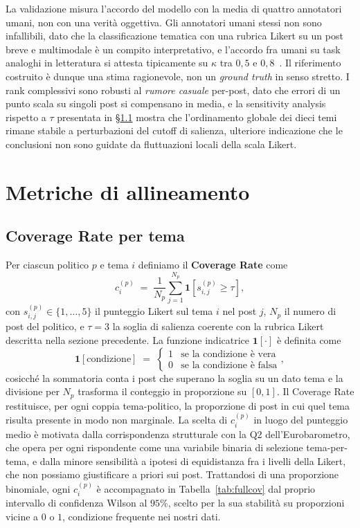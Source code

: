 \documentclass[11pt, a4paper]{article}
\begin{document}
La validazione misura l'accordo del modello con la media di quattro
annotatori umani, non con una verit\`a oggettiva. Gli annotatori umani
stessi non sono infallibili, dato che la classificazione tematica con
una rubrica Likert su un post breve e multimodale \`e un compito
interpretativo, e l'accordo fra umani su task analoghi in letteratura
si attesta tipicamente su $\kappa$ tra $0{,}5$ e
$0{,}8$~\cite{artstein2008}. Il riferimento costruito \`e dunque una
stima ragionevole, non un \textit{ground truth} in senso stretto. I
rank complessivi sono robusti al \emph{rumore casuale} per-post, dato
che errori di un punto scala su singoli post si compensano in media,
e la sensitivity analysis rispetto a $\tau$ presentata in
\S\ref{sec:coverage} mostra che l'ordinamento globale dei dieci temi
rimane stabile a perturbazioni del cutoff di salienza, ulteriore
indicazione che le conclusioni non sono guidate da fluttuazioni
locali della scala Likert.

\section{Metriche di allineamento}

\subsection{Coverage Rate per tema}\label{sec:coverage}

Per ciascun politico $p$ e tema $i$ definiamo il \textbf{Coverage
Rate} come
\[
  c_i^{(p)} \;=\; \frac{1}{N_p}\sum_{j=1}^{N_p}
  \mathbf{1}\!\left[s_{i,j}^{(p)} \geq \tau\right],
\]
con $s_{i,j}^{(p)}\in\{1,\dots,5\}$ il punteggio Likert sul tema $i$
nel post $j$, $N_p$ il numero di post del politico, e $\tau=3$ la
soglia di salienza coerente con la rubrica Likert descritta nella sezione precedente. La
funzione indicatrice $\mathbf{1}[\cdot]$ \`e definita come
\[
  \mathbf{1}[\text{condizione}] \;=\; \begin{cases}
    1 & \text{se la condizione \`e vera}\\
    0 & \text{se la condizione \`e falsa}
  \end{cases},
\]
cosicch\'e la sommatoria conta i post che superano la soglia su un
dato tema e la divisione per $N_p$ trasforma il conteggio in
proporzione su $[0,1]$. Il Coverage Rate restituisce, per ogni coppia
tema-politico, la proporzione di post in cui quel tema risulta
presente in modo non marginale. La scelta di $c_i^{(p)}$ in luogo del
punteggio medio \`e motivata dalla corrispondenza strutturale con la
Q2 dell'Eurobarometro, che opera per ogni rispondente come una
variabile binaria di selezione tema-per-tema, e dalla minore
sensibilit\`a a ipotesi di equidistanza fra i livelli della Likert,
che non possiamo giustificare a priori sui post. Trattandosi di una
proporzione binomiale, ogni $c_i^{(p)}$ \`e accompagnato in
Tabella~\ref{tab:fullcov} dal proprio intervallo di confidenza Wilson
al $95\%$, scelto per la sua stabilit\`a su proporzioni vicine a $0$ o
$1$, condizione frequente nei nostri dati.
\end{document}
